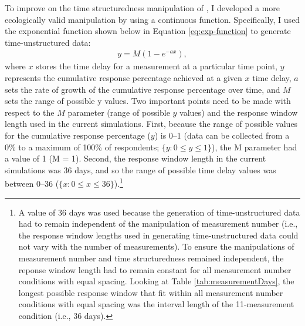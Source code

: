 \documentclass[
12pt, %
twoside,
english]{guelphthesis}
\begin{document}
To improve on the time structuredness manipulation of \textcite{coulombe2016}, I developed a more ecologically valid manipulation by using a continuous function. Specifically, I used the exponential function shown below in Equation \ref{eq:exp-function} to generate time-unstructured data:
\begin{align}
y = M(1 - e^{-ax}),
\label{eq:exp-function} 
\end{align}
\noindent where \(x\) stores the time delay for a measurement at a particular time point, \(y\) represents the cumulative response percentage achieved at a given \(x\) time delay, \(a\) sets the rate of growth of the cumulative response percentage over time, and \(M\) sets the range of possible y values. Two important points need to be made with respect to the \(M\) parameter (range of possible \(y\) values) and the response window length used in the current simulations. First, because the range of possible values for the cumulative response percentage (\(y\)) is 0--1 (data can be collected from a 0\% to a maximum of 100\% of respondents; \(\{y : 0 \le y \le 1\}\)), the M parameter had a value of 1 (M = 1). Second, the response window length in the current simulations was 36 days, and so the range of possible time delay values was between 0--36 (\(\{x:0\le x \le36\}\)).\footnote{A value of 36 days was used because the generation of time-unstructured data had to remain independent of the manipulation of measurement number (i.e., the response window lengths used in generating time-unstructured data could not vary with the number of measurements). To ensure the manipulations of measurement number and time structuredness remained independent, the reponse window length had to remain constant for all measurement number conditions with equal spacing. Looking at Table \ref{tab:measurementDays}, the longest possible response window that fit within all measurement number conditions with equal spacing was the interval length of the 11-measurement condition (i.e., 36 days).}
\end{document}
